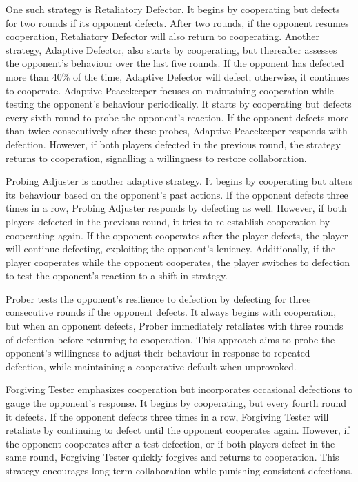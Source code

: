 \documentclass[11pt,preprint]{elsarticle}
\numberwithin{equation}{section}
\numberwithin{figure}{section}
\numberwithin{table}{section}
\begin{document}
One such strategy is Retaliatory Defector. It begins by cooperating but
defects for two rounds if its opponent defects. After two rounds, if the
opponent resumes cooperation, Retaliatory Defector will also return to
cooperating. Another strategy, Adaptive Defector, also starts by
cooperating, but thereafter assesses the opponent's behaviour over the
last five rounds. If the opponent has defected more than 40\% of the
time, Adaptive Defector will defect; otherwise, it continues to
cooperate. Adaptive Peacekeeper focuses on maintaining cooperation while
testing the opponent's behaviour periodically. It starts by cooperating
but defects every sixth round to probe the opponent's reaction. If the
opponent defects more than twice consecutively after these probes,
Adaptive Peacekeeper responds with defection. However, if both players
defected in the previous round, the strategy returns to cooperation,
signalling a willingness to restore collaboration.

Probing Adjuster is another adaptive strategy. It begins by cooperating
but alters its behaviour based on the opponent's past actions. If the
opponent defects three times in a row, Probing Adjuster responds by
defecting as well. However, if both players defected in the previous
round, it tries to re-establish cooperation by cooperating again. If the
opponent cooperates after the player defects, the player will continue
defecting, exploiting the opponent's leniency. Additionally, if the
player cooperates while the opponent cooperates, the player switches to
defection to test the opponent's reaction to a shift in strategy.

Prober tests the opponent's resilience to defection by defecting for
three consecutive rounds if the opponent defects. It always begins with
cooperation, but when an opponent defects, Prober immediately retaliates
with three rounds of defection before returning to cooperation. This
approach aims to probe the opponent's willingness to adjust their
behaviour in response to repeated defection, while maintaining a
cooperative default when unprovoked.

Forgiving Tester emphasizes cooperation but incorporates occasional
defections to gauge the opponent's response. It begins by cooperating,
but every fourth round it defects. If the opponent defects three times
in a row, Forgiving Tester will retaliate by continuing to defect until
the opponent cooperates again. However, if the opponent cooperates after
a test defection, or if both players defect in the same round, Forgiving
Tester quickly forgives and returns to cooperation. This strategy
encourages long-term collaboration while punishing consistent
defections.
\end{document}
